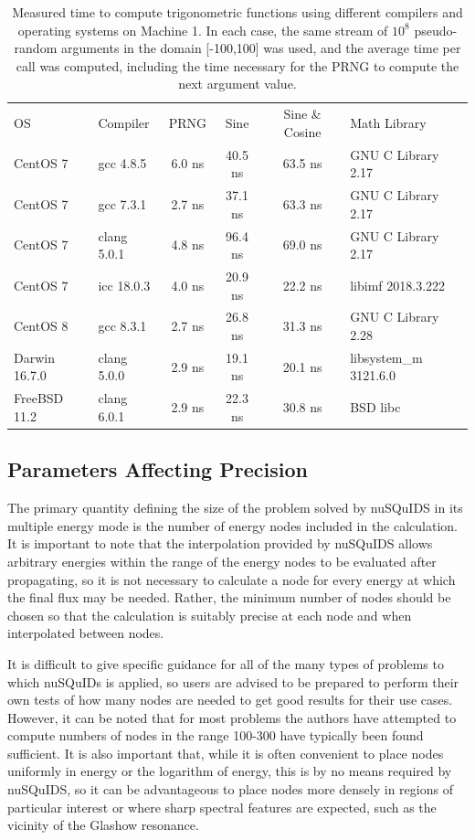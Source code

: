 \documentclass[3p,12pt]{elsarticle}
\newcommand{\ttf}{\ttfamily}
\begin{document}
\begin{table}
	\begin{tabular}{ llcccl }
		OS & Compiler & PRNG & Sine & Sine \& Cosine & Math Library \\
		CentOS 7 & gcc 4.8.5 & 6.0 ns & 40.5 ns & 63.5 ns & GNU C Library  2.17 \\
		CentOS 7 & gcc 7.3.1 & 2.7 ns & 37.1 ns & 63.3 ns & GNU C Library  2.17 \\
		CentOS 7 & clang 5.0.1 & 4.8 ns & 96.4 ns & 69.0 ns & GNU C Library  2.17 \\
		CentOS 7 & icc 18.0.3 & 4.0 ns & 20.9 ns & 22.2 ns & libimf 2018.3.222\\
		CentOS 8 & gcc 8.3.1 & 2.7 ns & 26.8 ns & 31.3 ns & GNU C Library  2.28\\
		Darwin 16.7.0 & clang 5.0.0 & 2.9 ns & 19.1 ns & 20.1 ns & libsystem\_m  3121.6.0 \\
		FreeBSD 11.2 & clang 6.0.1 & 2.9 ns & 22.3 ns & 30.8 ns & BSD libc
	\end{tabular}
	\caption{
		Measured time to compute trigonometric functions using different compilers and operating systems on Machine 1. In each case, the same stream of $10^8$ pseudo-random arguments in the domain [-100,100] was used, and the average time per call was computed, including the time necessary for the PRNG to compute the next argument value. 
	}
	\label{tab:trig_perf}
\end{table}

\subsection{Parameters Affecting Precision}
\label{ssec:precision_parameters} 

The primary quantity defining the size of the problem solved by {\ttf nuSQuIDS} in its multiple energy mode is the number of energy nodes included in the calculation. 
It is important to note that the interpolation provided by {\ttf nuSQuIDS} allows arbitrary energies within the range of the energy nodes to be evaluated after propagating, so it is not necessary to calculate a node for every energy at which the final flux may be needed. 
Rather, the minimum number of nodes should be chosen so that the calculation is suitably precise at each node and when interpolated between nodes. 

It is difficult to give specific guidance for all of the many types of problems to which {\ttf nuSQuIDs} is applied, so users are advised to be prepared to perform their own tests of how many nodes are needed to get good results for their use cases. 
However, it can be noted that for most problems the authors have attempted to compute numbers of nodes in the range 100-300 have typically been found sufficient. 
It is also important that, while it is often convenient to place nodes uniformly in energy or the logarithm of energy, this is by no means required by {\ttf nuSQuIDS}, so it can be advantageous to place nodes more densely in regions of particular interest or where sharp spectral features are expected, such as the vicinity of the Glashow resonance. 
\end{document}
